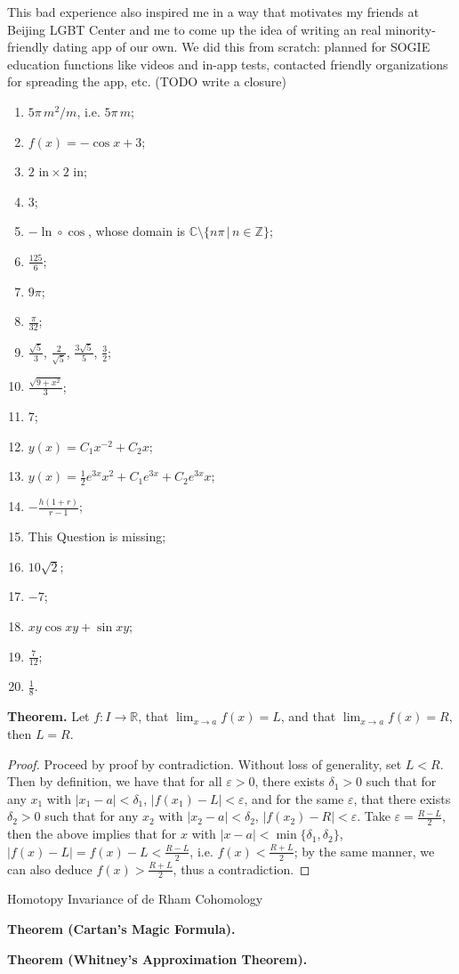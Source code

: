\documentclass[10pt]{article}
\begin{document}
\begin{CJK*}{UTF8}{gbsn}
This bad experience also inspired me in a way that motivates my friends at Beijing LGBT Center and me to come up the idea of writing an real minority-friendly dating app of our own. We did this from scratch: planned for SOGIE education functions like videos and in-app tests, contacted friendly organizations for spreading the app, etc. (TODO write a closure)

\newpage
\begin{enumerate}[label=\arabic*.]
\item $5\pi\,m^2/m$, i.e. $5\pi\,m$;
\item $f(x)=-\cos x+3$;
\item $2\text{ in}\times 2\text{ in}$;
\item $3$;
\item $-\ln\circ\cos$, whose domain is $\mathbb{C}\setminus\{n\pi\,|\,n\in\mathbb{Z}\}$;
\item $\displaystyle\frac{125}{6}$;
\item $9\pi$;
\item $\displaystyle\frac{\pi}{32}$;
\item $\displaystyle\frac{\sqrt{5}}{3}$, $\displaystyle\frac{2}{\sqrt{5}}$, $\displaystyle\frac{3\sqrt{5}}{5}$, $\displaystyle\frac{3}{2}$;
\item $\displaystyle\frac{\sqrt{9+x^2}}{3}$;
\item $7$;
\item $\displaystyle y(x)=C_1x^{-2}+C_2 x$;
\item $\displaystyle y(x)=\frac{1}{2}e^{3x}x^2+C_1e^{3x}+C_2e^{3x}x$;
\item $\displaystyle-\frac{h(1+r)}{r-1}$;
\item This Question is missing;
\item $10\sqrt{2}$;
\item $-7$;
\item $xy\cos xy+\sin xy$;
\item $\displaystyle\frac{7}{12}$;
\item $\displaystyle\frac{1}{8}$.
\end{enumerate}

\textbf{Theorem.} Let $f:I\to\mathbb{R}$, that $\lim_{x\to a}f(x)=L$, and that $\lim_{x\to a}f(x)=R$, then $L=R$.
\begin{proof}
Proceed by proof by contradiction. Without loss of generality, set $L<R$. Then by definition, we have that for all $\varepsilon>0$, there exists $\delta_1>0$ such that for any $x_1$ with $|x_1-a|<\delta_1$, $|f(x_1)-L|<\varepsilon$, and for the same $\varepsilon$, that there exists $\delta_2>0$ such that for any $x_2$ with $|x_2-a|<\delta_2$, $|f(x_2)-R|<\varepsilon$. Take $\varepsilon=\frac{R-L}{2}$, then the above implies that for $x$ with $|x-a|<\min\{\delta_1,\delta_2\}$, $|f(x)-L|=f(x)-L<\frac{R-L}{2}$, i.e. $f(x)<\frac{R+L}{2}$; by the same manner, we can also deduce $f(x)>\frac{R+L}{2}$, thus a contradiction.
\end{proof}

\newpage
{\Huge Homotopy Invariance of de Rham Cohomology}

\textbf{Theorem (Cartan's Magic Formula).}

\textbf{Theorem (Whitney's Approximation Theorem).}

\end{CJK*}
\end{document}
